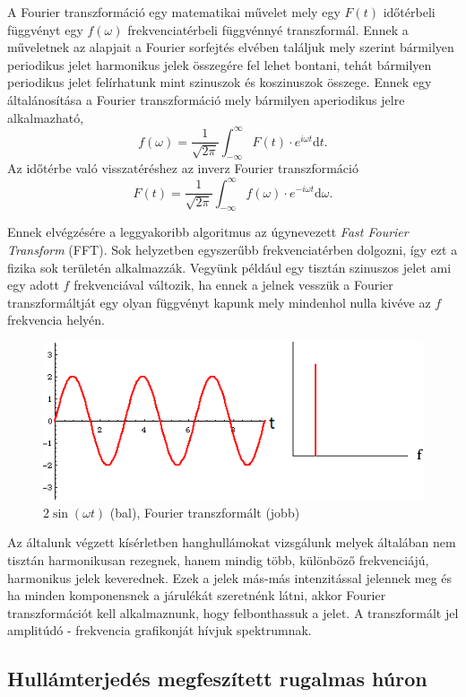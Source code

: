 \documentclass[a4paper,12pt]{article}
\newcommand{\D}{\mathrm{d}}
\begin{document}
A Fourier transzformáció egy matematikai művelet mely egy $F(t)$ időtérbeli függvényt egy $f(\omega)$ frekvenciatérbeli függvénnyé transzformál. Ennek a műveletnek az alapjait a Fourier sorfejtés elvében találjuk mely szerint bármilyen periodikus jelet harmonikus jelek összegére fel lehet bontani, tehát bármilyen periodikus jelet felírhatunk mint szinuszok és koszinuszok összege. Ennek egy általánosítása a Fourier transzformáció mely bármilyen aperiodikus jelre alkalmazható,
$$ f(\omega) = \frac{1}{\sqrt{2\pi}} \int^{\infty}_{-\infty} F(t) \cdot e^{i \omega t} \D t. $$
Az időtérbe való visszatéréshez az inverz Fourier transzformáció
$$ F(t) = \frac{1}{\sqrt{2\pi}} \int^{\infty}_{-\infty} f(\omega) \cdot e^{-i \omega t} \D \omega. $$

Ennek elvégzésére a leggyakoribb algoritmus az úgynevezett \emph{Fast Fourier Transform} (FFT). Sok helyzetben egyszerűbb frekvenciatérben dolgozni, így ezt a fizika sok területén alkalmazzák. Vegyünk például egy tisztán szinuszos jelet ami egy adott $f$ frekvenciával változik, ha ennek a jelnek vesszük a Fourier transzformáltját egy olyan függvényt kapunk mely mindenhol nulla kivéve az $f$ frekvencia helyén.

\begin{figure}[!h]
\centering
\includegraphics[scale=1]{PowerSpectrum1.png}
\caption{$2 \sin(\omega t)$ (bal), Fourier transzformált (jobb)}
\end{figure} 

Az általunk végzett kísérletben hanghullámokat vizsgálunk melyek általában nem tisztán harmonikusan rezegnek, hanem mindig több, különböző frekvenciájú, harmonikus jelek keverednek. Ezek a jelek más-más intenzitással jelennek meg és ha minden komponensnek a járulékát szeretnénk látni, akkor Fourier transzformációt kell alkalmaznunk, hogy felbonthassuk a jelet. A transzformált jel amplitúdó - frekvencia grafikonját hívjuk spektrumnak.

\subsection{Hullámterjedés megfeszített rugalmas húron}
\end{document}
